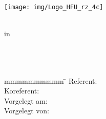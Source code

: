 
\begin{titlepage}
	\thispagestyle{empty}
	\texttt{[image: img/Logo\_HFU\_rz\_4c]}
	\enlargethispage{20mm}
	\begin{center}
		{\fontsize{18pt}{27pt}\selectfont \artderarbeit \\ in \\ \studiengang \\[1em]}
		{\fontsize{22pt}{55pt}\selectfont \textbf \titel \\[1em]}
		{\fontsize{18pt}{27pt}\selectfont \untertitel \\}
		\vfill
		\parbox{0cm}{\begin{tabbing}
			mmmmmmmmmm \= \kill
			Referent: \> \\
			Koreferent: \> \koreferent\\
			Vorgelegt am: \> \vorgelegtam\\
			Vorgelegt von: \> \studentname\\
			\> \studentnr\\
			\> \studentstr\\
			\> \studentstadt\\
			\> \studentemail\\
		\end{tabbing}}
	\end{center}
\end{titlepage}

\cleardoubleemptypage
